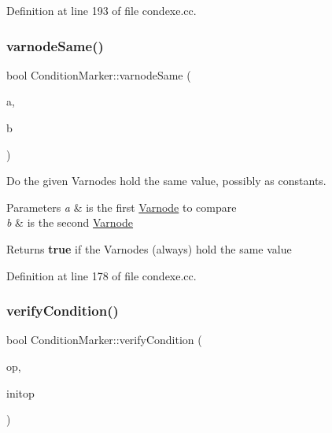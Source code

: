 Definition at line 193 of file condexe.\+cc.

\mbox{\label{class_condition_marker_ab142a297ad508117562f6cdb323177b3}} 
\subsubsection{\texorpdfstring{varnodeSame()}{varnodeSame()}}
{\footnotesize\ttfamily bool Condition\+Marker\+::varnode\+Same (\begin{DoxyParamCaption}\item[{\mbox{\hyperlink{class_varnode}{Varnode}} $\ast$}]{a,  }\item[{\mbox{\hyperlink{class_varnode}{Varnode}} $\ast$}]{b }\end{DoxyParamCaption})\hspace{0.3cm}{\ttfamily [static]}}



Do the given Varnodes hold the same value, possibly as constants. 


\begin{DoxyParams}{Parameters}
{\em a} & is the first \mbox{\hyperlink{class_varnode}{Varnode}} to compare \\
\hline
{\em b} & is the second \mbox{\hyperlink{class_varnode}{Varnode}} \\
\hline
\end{DoxyParams}
\begin{DoxyReturn}{Returns}
{\bfseries{true}} if the Varnodes (always) hold the same value 
\end{DoxyReturn}


Definition at line 178 of file condexe.\+cc.

\mbox{\label{class_condition_marker_a46df93505aa04dd2d8b77239b272092f}} 
\subsubsection{\texorpdfstring{verifyCondition()}{verifyCondition()}}
{\footnotesize\ttfamily bool Condition\+Marker\+::verify\+Condition (\begin{DoxyParamCaption}\item[{\mbox{\hyperlink{class_pcode_op}{Pcode\+Op}} $\ast$}]{op,  }\item[{\mbox{\hyperlink{class_pcode_op}{Pcode\+Op}} $\ast$}]{initop }\end{DoxyParamCaption})}



